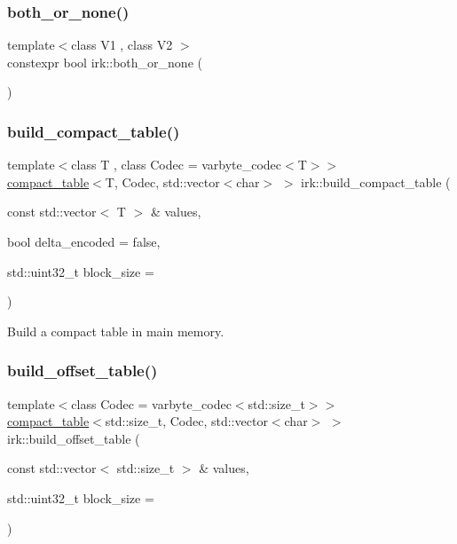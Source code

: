 \subsubsection{\texorpdfstring{both\+\_\+or\+\_\+none()}{both\_or\_none()}}
{\footnotesize\ttfamily template$<$class V1 , class V2 $>$ \\
constexpr bool irk\+::both\+\_\+or\+\_\+none (\begin{DoxyParamCaption}{ }\end{DoxyParamCaption})}

\mbox{\label{namespaceirk_ad911a2a5cd8986d97fd92eec33683377}} 
\subsubsection{\texorpdfstring{build\+\_\+compact\+\_\+table()}{build\_compact\_table()}}
{\footnotesize\ttfamily template$<$class T , class Codec  = varbyte\+\_\+codec$<$\+T$>$$>$ \\
\mbox{\hyperlink{classirk_1_1compact__table}{compact\+\_\+table}}$<$T, Codec, std\+::vector$<$char$>$ $>$ irk\+::build\+\_\+compact\+\_\+table (\begin{DoxyParamCaption}\item[{const std\+::vector$<$ T $>$ \&}]{values,  }\item[{bool}]{delta\+\_\+encoded = {\ttfamily false},  }\item[{std\+::uint32\+\_\+t}]{block\+\_\+size = {} }\end{DoxyParamCaption})}



Build a compact table in main memory. 

\mbox{\label{namespaceirk_af80eeaf7666165b73f3c5787bb51e407}} 
\subsubsection{\texorpdfstring{build\+\_\+offset\+\_\+table()}{build\_offset\_table()}}
{\footnotesize\ttfamily template$<$class Codec  = varbyte\+\_\+codec$<$std\+::size\+\_\+t$>$$>$ \\
\mbox{\hyperlink{classirk_1_1compact__table}{compact\+\_\+table}}$<$std\+::size\+\_\+t, Codec, std\+::vector$<$char$>$ $>$ irk\+::build\+\_\+offset\+\_\+table (\begin{DoxyParamCaption}\item[{const std\+::vector$<$ std\+::size\+\_\+t $>$ \&}]{values,  }\item[{std\+::uint32\+\_\+t}]{block\+\_\+size = {} }\end{DoxyParamCaption})}



